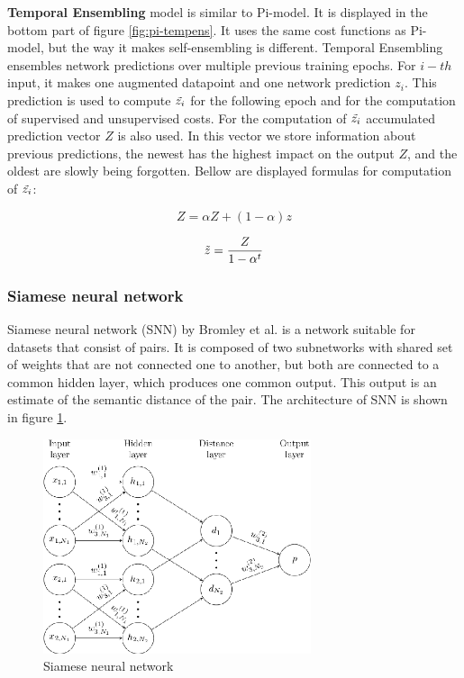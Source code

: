 \textbf{Temporal Ensembling} model is similar to Pi-model. It is displayed in the bottom part of figure \ref{fig:pi-tempens}. It uses the same cost functions as Pi-model, but the way it makes self-ensembling is different. Temporal Ensembling ensembles network predictions over multiple previous training epochs. For $i-th$ input, it makes one augmented datapoint and one network prediction $z_i$. This prediction is used to compute $\Tilde{z_i}$ for the following epoch and for the computation of supervised and unsupervised costs. 
For the computation of $\Tilde{z_i}$ accumulated prediction vector $Z$ is also used. In this vector we store information about previous predictions, the newest has the highest impact on the output $Z$, and the oldest are slowly being forgotten. Bellow are displayed formulas for computation of $\Tilde{z_i}$:

\begin{equation}
    Z = \alpha Z + (1 - \alpha) z
\end{equation}

\begin{equation}
        \Tilde{z} = \frac{Z}{1 - \alpha^t}
\end{equation}

\subsubsection{Siamese neural network}
Siamese neural network (SNN) by Bromley et al. \cite{bromley1993} is a network suitable for datasets that consist of pairs. It is composed of two subnetworks with shared set of weights that are not connected one to another, but both are connected to a common hidden layer, which produces one common output. This output is an estimate of the semantic distance of the pair. The architecture of SNN is shown in figure \ref{fig:siamese}.


\begin{figure}[h!]
    \centering
    \includegraphics[width=0.7\textwidth]{figs/siamese.png}
    \caption{Siamese neural network \cite{Koch2015SiameseNN}}
    \label{fig:siamese}
\end{figure}


